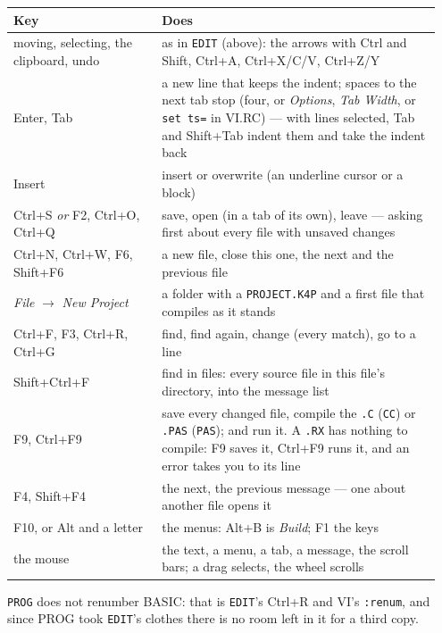 \begin{center}
\small
\begin{tabular}{@{}>{\raggedright\arraybackslash}p{0.33\linewidth} >{\raggedright\arraybackslash}p{0.62\linewidth}@{}}
\toprule
\textbf{Key} & \textbf{Does} \\
\midrule
moving, selecting, the clipboard, undo & as in \verb|EDIT| (above): the arrows with Ctrl and Shift, Ctrl+A, Ctrl+X/C/V, Ctrl+Z/Y \\
Enter, Tab & a new line that keeps the indent; spaces to the next tab stop (four, or \emph{Options}, \emph{Tab Width}, or \verb|set ts=| in VI.RC) --- with lines selected, Tab and Shift+Tab indent them and take the indent back \\
Insert & insert or overwrite (an underline cursor or a block) \\
Ctrl+S \emph{or} F2, Ctrl+O, Ctrl+Q & save, open (in a tab of its own), leave --- asking first about every file with unsaved changes \\
Ctrl+N, Ctrl+W, F6, Shift+F6 & a new file, close this one, the next and the previous file \\
\emph{File} $\rightarrow$ \emph{New Project} & a folder with a \texttt{PROJECT.K4P} and a first file that compiles as it stands \\
Ctrl+F, F3, Ctrl+R, Ctrl+G & find, find again, change (every match), go to a line \\
Shift+Ctrl+F & find in files: every source file in this file's directory, into the message list \\
F9, Ctrl+F9 & save every changed file, compile the \texttt{.C} (\verb|CC|) or \texttt{.PAS} (\verb|PAS|); and run it. A \texttt{.RX} has nothing to compile: F9 saves it, Ctrl+F9 runs it, and an error takes you to its line \\
F4, Shift+F4 & the next, the previous message --- one about another file opens it \\
F10, or Alt and a letter & the menus: Alt+B is \emph{Build}; F1 the keys \\
the mouse & the text, a menu, a tab, a message, the scroll bars; a drag selects, the wheel scrolls \\
\bottomrule
\end{tabular}
\end{center}

\verb|PROG| does not renumber BASIC: that is \verb|EDIT|'s Ctrl+R and VI's
\verb|:renum|, and since PROG took \verb|EDIT|'s clothes there is no room
left in it for a third copy.

